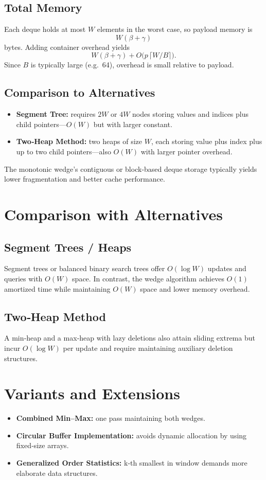\documentclass[12pt,letterpaper]{article}
\begin{document}
\subsection{Total Memory}
Each deque holds at most \(W\) elements in the worst case, so payload memory is
\[
W(\beta+\gamma)
\]
bytes.  Adding container overhead yields
\[
W(\beta+\gamma) + O\bigl(p\,\lceil W/B\rceil\bigr).
\]
Since \(B\) is typically large (e.g.\ 64), overhead is small relative to payload.

\subsection{Comparison to Alternatives}
\begin{itemize}
  \item \textbf{Segment Tree:} requires \(2W\) or \(4W\) nodes storing values and indices plus child pointers—\(O(W)\) but with larger constant.
  \item \textbf{Two‐Heap Method:} two heaps of size \(W\), each storing value plus index plus up to two child pointers—also \(O(W)\) with larger pointer overhead.
\end{itemize}
The monotonic wedge’s contiguous or block‐based deque storage typically yields lower fragmentation and better cache performance.

\section{Comparison with Alternatives}
\subsection{Segment Trees / Heaps}
Segment trees or balanced binary search trees offer \(O(\log W)\) updates and queries with \(O(W)\) space.  In contrast, the wedge algorithm achieves \(O(1)\) amortized time while maintaining \(O(W)\) space and lower memory overhead.

\subsection{Two‐Heap Method}
A min‐heap and a max‐heap with lazy deletions also attain sliding extrema but incur \(O(\log W)\) per update and require maintaining auxiliary deletion structures.

\section{Variants and Extensions}
\begin{itemize}
  \item \textbf{Combined Min–Max:} one pass maintaining both wedges.
  \item \textbf{Circular Buffer Implementation:} avoids dynamic allocation by using fixed‐size arrays.
  \item \textbf{Generalized Order Statistics:} k‐th smallest in window demands more elaborate data structures.
\end{itemize}
\end{document}
